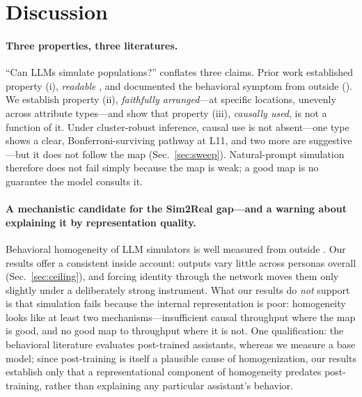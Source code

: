 \section{Discussion}
\label{sec:discussion}

\paragraph{Three properties, three literatures.}
``Can LLMs simulate populations?'' conflates three claims. Prior work
established property (i), \emph{readable} \citep{llmopinions2026}, and
documented the behavioral symptom from outside
(\citealp{sim2real2026,odyssim2026}). We establish property (ii),
\emph{faithfully arranged}---at specific locations, unevenly across
attribute types---and show that property (iii), \emph{causally used}, is
not a function of it. Under cluster-robust inference, causal use is not
absent---one type shows a clear, Bonferroni-surviving pathway at L11, and
two more are suggestive---but it does not follow the map
(Sec.~\ref{sec:sweep}). Natural-prompt simulation therefore does not fail
simply because the map is weak; a good map is no guarantee the model
consults it.

\paragraph{A mechanistic candidate for the Sim2Real gap---and a warning
about explaining it by representation quality.}
Behavioral homogeneity of LLM simulators is well measured from outside
\citep{sim2real2026}. Our results offer a consistent inside account:
outputs vary little across personas overall
(Sec.~\ref{sec:ceiling}), and forcing identity through the network moves
them only slightly under a deliberately strong instrument. What our
results do \emph{not} support is that simulation fails because the
internal representation is poor: homogeneity looks like at least two
mechanisms---insufficient causal throughput where the map is good, and no
good map to throughput where it is not. One qualification: the behavioral
literature evaluates post-trained assistants, whereas we measure a base
model; since post-training is itself a plausible cause of
homogenization, our results establish only that a representational
component of homogeneity predates post-training, rather than explaining
any particular assistant's behavior.

